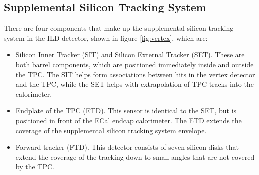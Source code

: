 \begin{figure}[h!]
\label{fig:tracker}
\end{figure} 


\subsection{Supplemental Silicon Tracking System}
There are four components that make up the supplemental silicon tracking system in the ILD detector, shown in figure \ref{fig:vertex}, which are:
\begin{itemize}
\item Silicon Inner Tracker (SIT) and Silicon External Tracker (SET).  These are both barrel components, which are positioned immediately inside and outside the TPC.  The SIT helps form associations between hits in the vertex detector and the TPC, while the SET helps with extrapolation of TPC tracks into the calorimeter.  
\item Endplate of the TPC (ETD).  This sensor is identical to the SET, but is positioned in front of the ECal endcap calorimeter.  The ETD extends the coverage of the supplemental silicon tracking system envelope. 
\item Forward tracker (FTD).  This detector consists of seven silicon disks that extend the coverage of the tracking down to small angles that are not covered by the TPC.  
\end{itemize}

